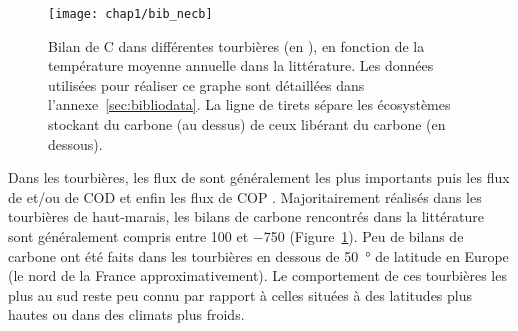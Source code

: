 \begin{figure}
\centering
\texttt{[image: chap1/bib\_necb]}
\caption{Bilan de C dans différentes tourbières (en \si{\gcma}), en fonction de la température moyenne annuelle dans la littérature. Les données utilisées pour réaliser ce graphe sont détaillées dans l'annexe~\ref{sec:bibliodata}. La ligne de tirets sépare les écosystèmes stockant du carbone (au dessus) de ceux libérant du carbone (en dessous).}
\label{fig:bib_necb}
\end{figure}


Dans les tourbières, les flux de \coo sont généralement les plus importants puis les flux de \chh et/ou de COD et enfin les flux de COP \citep{worrall2009,koehler2011}.
Majoritairement réalisés dans les tourbières de haut-marais, les bilans de carbone rencontrés dans la littérature sont généralement compris entre 100 et \SI{-750}{\gcma} (Figure~\ref{fig:bib_necb}).
Peu de bilans de carbone ont été faits dans les tourbières en dessous de \SI{50}{\degree} de latitude en Europe (le nord de la France approximativement).
Le comportement de ces tourbières les plus au sud reste peu connu par rapport à celles situées à des latitudes plus hautes ou dans des climats plus froids.

